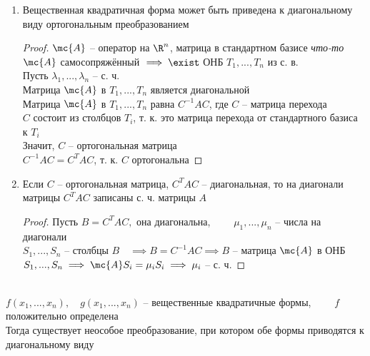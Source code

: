 \begin{theorem}\label{th:quad_form}
	\hfill
	\begin{enumerate}
		\item Вещественная квадратичная форма может быть приведена к диагональному виду ортогональным преобразованием
		\begin{proof}
			$ \mc{A} $ -- оператор на $ \R^n $, матрица в стандартном базисе \textit{что-то} \\
			$ \mc{A} $ самосопряжённый $ \implies \exist $ ОНБ $ T_1, ..., T_n $ из с. в. \\
			Пусть $ \lambda_1, ..., \lambda_n $ -- с. ч. \\
			Матрица $ \mc{A} $ в $ T_1, ..., T_n $ является диагональной \\
			Матрица $ \mc{A} $ в $ T_1, ..., T_n $ равна $ C^{-1}AC $, где $ C $ -- матрица перехода \\
			$ C $ состоит из столбцов $ T_i $, т. к. это матрица перехода от стандартного базиса к $ T_i $ \\
			Значит, $ C $ -- ортогональная матрица \\
			$ C^{-1}AC = C^TAC $, т. к. $ C $ ортогональна
		\end{proof}
		\item Если $ C $ -- ортогональная матрица, $ C^TAC $ -- диагональная, то на диагонали матрицы $ C^TAC $ записаны с. ч. матрицы $ A $
		\begin{proof}
			Пусть $ B = C^TAC, $ она диагональна, $ \qquad \mu_1, ..., \mu_n $ -- числа на диагонали \\
			$ S_1, ..., S_n $ -- столбцы $ B \quad \implies B = C^{-1}AC \implies B $ -- матрица $ \mc{A} $ в ОНБ $ S_1, ..., S_n \implies \mc{A}S_i = \mu_iS_i \implies \mu_i $ -- с. ч.
		\end{proof}
	\end{enumerate}
\end{theorem}

\begin{theorem}
	\hfill \\
	$ f(x_1, ..., x_n), \quad g(x_1, ..., x_n) $ -- вещественные квадратичные формы, $ \qquad f $ положительно определена \\
	Тогда существует неособое преобразование, при котором обе формы приводятся к диагональному виду
\end{theorem}


